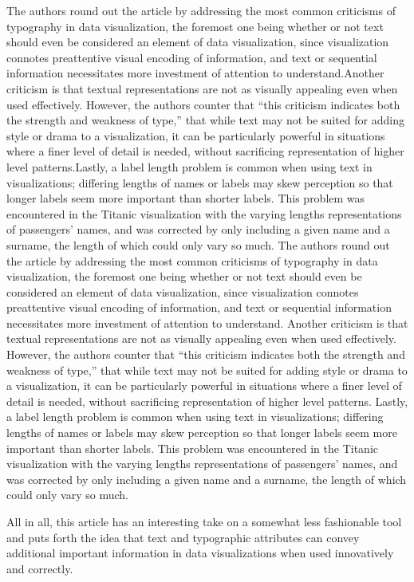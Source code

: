 \documentclass[]{book}
\theoremstyle{definition}
\theoremstyle{definition}
\theoremstyle{definition}
\theoremstyle{remark}
\begin{document}
The authors round out the article by addressing the most common
criticisms of typography in data visualization, the foremost one being
whether or not text should even be considered an element of data
visualization, since visualization connotes preattentive visual encoding
of information, and text or sequential information necessitates more
investment of attention to understand.Another criticism is that textual
representations are not as visually appealing even when used
effectively. However, the authors counter that ``this criticism
indicates both the strength and weakness of type,'' that while text may
not be suited for adding style or drama to a visualization, it can be
particularly powerful in situations where a finer level of detail is
needed, without sacrificing representation of higher level
patterns.Lastly, a label length problem is common when using text in
visualizations; differing lengths of names or labels may skew perception
so that longer labels seem more important than shorter labels. This
problem was encountered in the Titanic visualization with the varying
lengths representations of passengers' names, and was corrected by only
including a given name and a surname, the length of which could only
vary so much. The authors round out the article by addressing the most
common criticisms of typography in data visualization, the foremost one
being whether or not text should even be considered an element of data
visualization, since visualization connotes preattentive visual encoding
of information, and text or sequential information necessitates more
investment of attention to understand. Another criticism is that textual
representations are not as visually appealing even when used
effectively. However, the authors counter that ``this criticism
indicates both the strength and weakness of type,'' that while text may
not be suited for adding style or drama to a visualization, it can be
particularly powerful in situations where a finer level of detail is
needed, without sacrificing representation of higher level patterns.
Lastly, a label length problem is common when using text in
visualizations; differing lengths of names or labels may skew perception
so that longer labels seem more important than shorter labels. This
problem was encountered in the Titanic visualization with the varying
lengths representations of passengers' names, and was corrected by only
including a given name and a surname, the length of which could only
vary so much.

All in all, this article has an interesting take on a somewhat less
fashionable tool and puts forth the idea that text and typographic
attributes can convey additional important information in data
visualizations when used innovatively and correctly.
\end{document}
